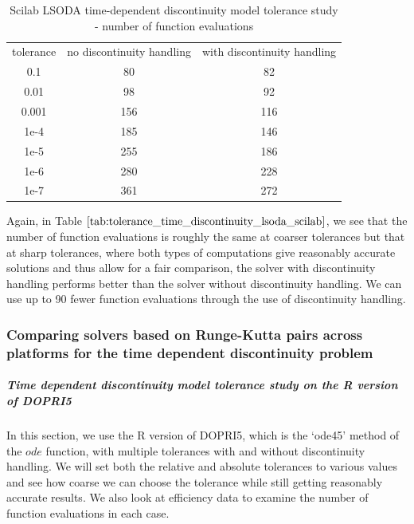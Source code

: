 \begin{table}[H]
\caption {Scilab LSODA time-dependent discontinuity model tolerance study - number of function evaluations} 
\label{tab:tolerance_time_discontinuity_lsoda_scilab} 
\begin{center}
\begin{tabular}{ c c c }
tolerance & no discontinuity handling & with discontinuity handling \\ 
0.1 & 80 & 82 \\
0.01 & 98 & 92 \\
0.001 & 156 & 116 \\
1e-4 & 185 & 146 \\
1e-5 & 255 & 186 \\
1e-6 & 280 & 228 \\
1e-7 & 361 & 272 \\
\end{tabular}
\end{center}
\end{table}
Again, in Table $\ref{tab:tolerance_time_discontinuity_lsoda_scilab}$, we see that the number of function evaluations is roughly the same at coarser tolerances but that at sharp tolerances, where both types of computations give reasonably accurate solutions and thus allow for a fair comparison, the solver with discontinuity handling performs better than the solver without discontinuity handling. We can use up to 90 fewer function evaluations through the use of discontinuity handling. 

\subsubsection{Comparing solvers based on Runge-Kutta pairs across platforms for the time dependent discontinuity problem}
\subparagraph{Time dependent discontinuity model tolerance study on the R version of DOPRI5}
In this section, we use the R version of DOPRI5, which is the `ode45' method of the $ode$ function, with multiple tolerances with and without discontinuity handling. We will set both the relative and absolute tolerances to various values and see how coarse we can choose the tolerance while still getting reasonably accurate results. We also look at efficiency data to examine the number of function evaluations in each case.

